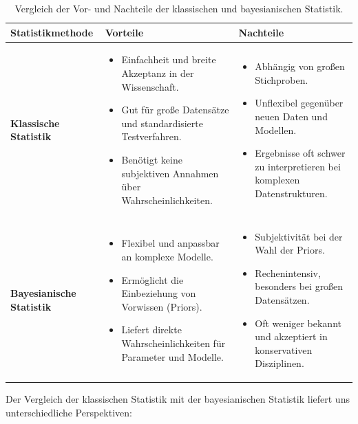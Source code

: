\documentclass[a4paper,12pt]{article}
\begin{document}
\newpage
\begin{table}[h!]
  \centering
  \begin{tabular}{|p{4cm}|p{5cm}|p{5cm}|}
  \hline
  \textbf{Statistikmethode} & \textbf{Vorteile} & \textbf{Nachteile} \\ \hline
  \textbf{Klassische Statistik} & 
  \begin{itemize}
      \item Einfachheit und breite Akzeptanz in der Wissenschaft.
      \item Gut für große Datensätze und standardisierte Testverfahren.
      \item Benötigt keine subjektiven Annahmen über Wahrscheinlichkeiten.
  \end{itemize} & 
  \begin{itemize}
      \item Abhängig von großen Stichproben.
      \item Unflexibel gegenüber neuen Daten und Modellen.
      \item Ergebnisse oft schwer zu interpretieren bei komplexen Datenstrukturen.
  \end{itemize} \\ \hline
  \textbf{Bayesianische Statistik} & 
  \begin{itemize}
      \item Flexibel und anpassbar an komplexe Modelle.
      \item Ermöglicht die Einbeziehung von Vorwissen (Priors).
      \item Liefert direkte Wahrscheinlichkeiten für Parameter und Modelle.
  \end{itemize} & 
  \begin{itemize}
      \item Subjektivität bei der Wahl der Priors.
      \item Rechenintensiv, besonders bei großen Datensätzen.
      \item Oft weniger bekannt und akzeptiert in konservativen Disziplinen.
  \end{itemize} \\ \hline
  \end{tabular}
  \caption{Vergleich der Vor- und Nachteile der klassischen und bayesianischen Statistik.}
  \label{tab:vergleich_vor_nachteile}
\end{table}

Der Vergleich der klassischen Statistik mit der bayesianischen Statistik liefert uns unterschiedliche Perspektiven:
\end{document}
